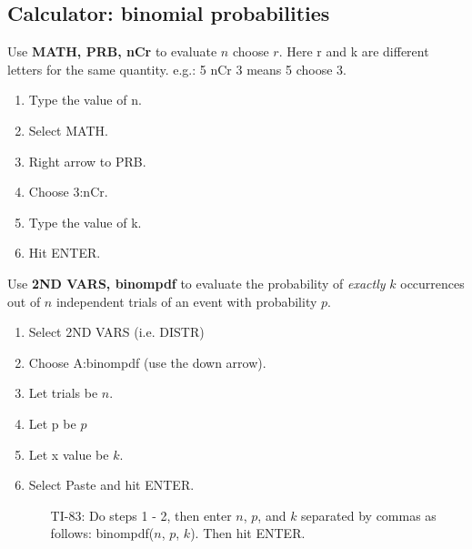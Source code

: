 \subsection{Calculator: binomial probabilities}
\label{calculatorBinomial}

\begin{termBox}{
Use \textbf{MATH, PRB, nCr} to evaluate $n$ choose $r$. Here r and k are different letters for the same quantity. e.g.: 5 nCr 3 means 5 choose 3.
\begin{enumerate}
\setlength{\itemsep}{0mm}
\item Type the value of n.
\item Select MATH.
\item Right arrow to PRB.
\item Choose 3:nCr.
\item Type the value of k.
\item Hit ENTER.
\end{enumerate}}
\end{termBox}

\begin{termBox}{ 
Use \textbf{2ND VARS, binompdf} to evaluate the probability of \emph{exactly} $k$ occurrences out of $n$ independent trials of an event with probability $p$. 
\begin{enumerate}
\setlength{\itemsep}{0mm}
\item Select 2ND VARS (i.e. DISTR)
\item Choose A:binompdf  (use the down arrow).
\item Let trials be $n$.
\item Let p be $p$
\item Let x value be $k$.
\item Select Paste and hit ENTER.\vspace{-1.5mm}
\begin{itemize}
\item[TI-83: ] Do steps 1 - 2, then enter $n$, $p$, and $k$ separated by commas as follows:  binompdf($n$, $p$, $k$). Then hit ENTER. 
\end{itemize}
\end{enumerate}
}
\end{termBox}

